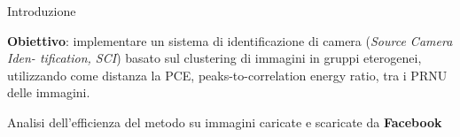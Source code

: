 
\begin{tframe}{Introduzione}

\vspace{0.5cm}

\textbf{Obiettivo}: implementare un sistema di identificazione di camera (\emph{Source Camera Iden- tification, SCI}) basato sul clustering di immagini in gruppi eterogenei, utilizzando come distanza la PCE, peaks-to-correlation energy ratio, tra i PRNU delle immagini. 

\vspace{1cm}
Analisi dell'efficienza del metodo su immagini caricate e scaricate da \textbf{Facebook}

\end{tframe}